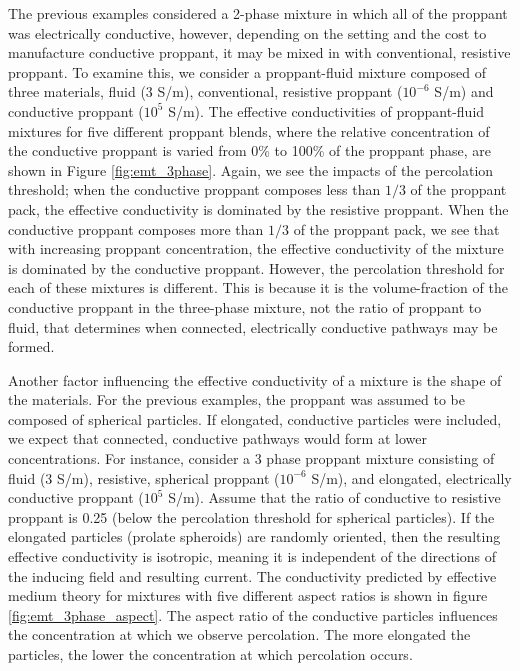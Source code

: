 

The previous examples considered a 2-phase mixture in which all of the proppant was electrically conductive, however, depending on the setting and the cost to manufacture conductive proppant, it may be mixed in with conventional, resistive proppant. To examine this, we consider a proppant-fluid mixture composed of three materials, fluid ($3$ S/m), conventional, resistive proppant ($10^{-6}$ S/m) and conductive proppant ($10^5$ S/m). The effective conductivities of proppant-fluid mixtures for five different proppant blends, where the relative concentration of the conductive proppant is varied from 0\% to 100\% of the proppant phase, are shown in Figure \ref{fig:emt_3phase}. Again, we see the impacts of the percolation threshold; when the conductive proppant composes less than $1/3$ of the proppant pack, the effective conductivity is dominated by the resistive proppant. When the conductive proppant composes more than $1/3$ of the proppant pack, we see that with increasing proppant concentration, the effective conductivity of the mixture is dominated by the conductive proppant. However, the percolation threshold for each of these mixtures is different. This is because it is the volume-fraction of the conductive proppant in the three-phase mixture, not the ratio of proppant to fluid, that determines when connected, electrically conductive pathways may be formed.




Another factor influencing the effective conductivity of a mixture is the shape of the materials. For the previous examples, the proppant was assumed to be composed of spherical particles. If elongated, conductive particles were included, we expect that connected, conductive pathways would form at lower concentrations. For instance, consider a 3 phase proppant mixture consisting of fluid (3 S/m), resistive, spherical proppant ($10^{-6}$ S/m), and elongated, electrically conductive proppant ($10^5$ S/m). Assume that the ratio of conductive to resistive proppant is 0.25 (below the percolation threshold for spherical particles). If the elongated particles (prolate spheroids) are randomly oriented, then the resulting effective conductivity is isotropic, meaning it is independent of the directions of the inducing field and resulting current. The conductivity predicted by effective medium theory for mixtures with five different aspect ratios is shown in figure \ref{fig:emt_3phase_aspect}. The aspect ratio of the conductive particles influences the concentration at which we observe percolation. The more elongated the particles, the lower the concentration at which percolation occurs.



